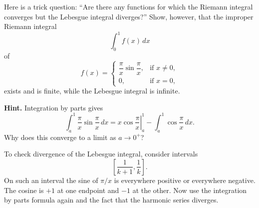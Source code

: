 \begin{problem}
    Here is a trick question: ``Are there any functions for which the Riemann
    integral converges but the Lebesgue integral diverges?'' 
    Show, however, that the improper Riemann integral
    \[
    \int_0^1 f(x)\,dx
    \]
    of
    \[
    f(x)=
    \begin{cases}
    \dfrac{\pi}{x}\sin\dfrac{\pi}{x}, & \text{if } x\neq 0,\\[1.2ex]
    0, & \text{if } x=0,
    \end{cases}
    \]
    exists and is finite, while the Lebesgue integral is infinite.
    
    \medskip
    
    \noindent
    \textbf{Hint.}
    Integration by parts gives
    \[
    \int_a^1 \frac{\pi}{x}\sin\frac{\pi}{x}\,dx
    =
    \left. x\cos\frac{\pi}{x}\right|_a^1
    -
    \int_a^1 \cos\frac{\pi}{x}\,dx.
    \]
    Why does this converge to a limit as \(a\to 0^+\)?
    
    To check divergence of the Lebesgue integral, consider intervals
    \[
    \left[\frac{1}{k+1},\frac{1}{k}\right].
    \]
    On such an interval the sine of \(\pi/x\) is everywhere positive or everywhere
    negative. The cosine is \(+1\) at one endpoint and \(-1\) at the other. Now use
    the integration by parts formula again and the fact that the harmonic series
    diverges.
\end{problem}


